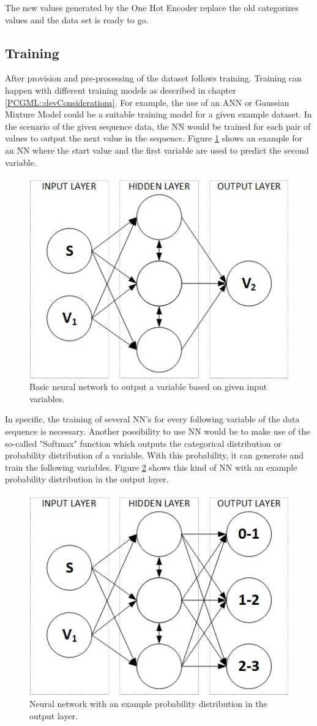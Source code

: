 \documentclass[MGS,Master,english]{twbook}%
\begin{document}
The new values generated by the One Hot Encoder replace the old categorizes values and the data set is ready to go.

\subsection{Training}
After provision and pre-processing of the dataset follows training. Training can happen with different training models as described in chapter \ref{PCGML::devConsiderations}. For example, the use of an ANN or Gaussian Mixture Model could be a suitable training model for a given example dataset. In the scenario of the given sequence data, the \ac{NN} would be trained for each pair of values to output the next value in the sequence. Figure \ref{fig::PCGML::devExample::NNbasic} shows an example for an \ac{NN} where the start value and the first variable are used to predict the second variable.
\begin{figure}[!htbp]
	\centering
	\includegraphics[width=0.45\linewidth]{PICs/PCGML_development_example_NN_basic}
	\caption{Basic neural network to output a variable based on given input variables.}\label{fig::PCGML::devExample::NNbasic}
\end{figure}
In specific, the training of several NN’s for every following variable of the data sequence is necessary. Another possibility to use NN would be to make use of the so-called "Softmax" function which outputs the categorical distribution or probability distribution of a variable. With this probability, it can generate and train the following variables. Figure \ref{fig::PCGML::devExample::NNwithSoftmax} shows this kind of NN with an example probability distribution in the output layer.
\begin{figure}[!htbp]
	\centering
	\includegraphics[width=0.45\linewidth]{PICs/PCGML_development_example_NN_categorical_distributions}
	\caption{Neural network with an example probability distribution in the output layer.}\label{fig::PCGML::devExample::NNwithSoftmax}
\end{figure}
\end{document}
